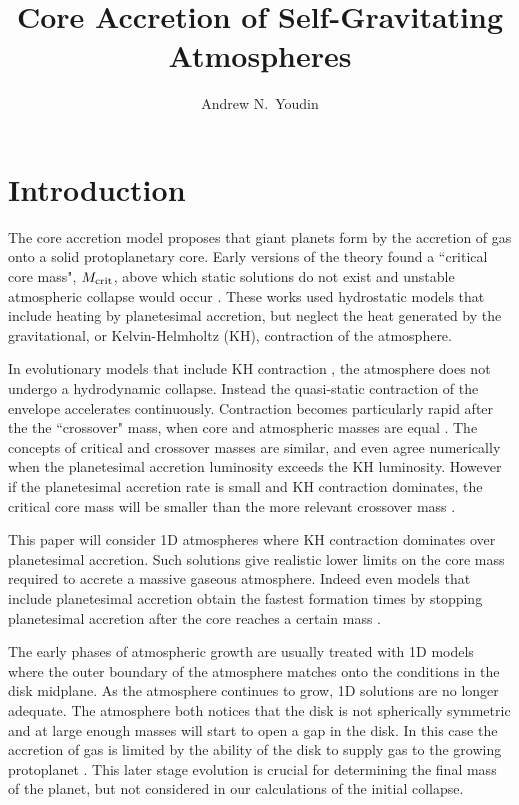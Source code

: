 \documentclass[12pt, preprint,numberedappendix]{emulateapj}
\newcommand{\MC}{M_{\rm crit}}
\begin{document}



\title{Core Accretion of Self-Gravitating Atmospheres}
\author{Andrew N.\ Youdin}

\section{Introduction}
The core accretion model \citep{PerCam74, MizNak78} proposes that giant planets form by the accretion of gas onto a solid protoplanetary core.    Early versions of the theory found a ``critical core mass", $\MC$, above which static solutions do not exist and unstable atmospheric collapse would occur \citep{Har78, Miz80}.  These works used hydrostatic models that include heating by planetesimal accretion, but neglect the heat generated by the gravitational, or Kelvin-Helmholtz (KH), contraction of the atmosphere.  

In evolutionary models that include KH contraction \citep{BodPol86}, the atmosphere does not undergo a hydrodynamic collapse.  Instead the quasi-static contraction of the envelope accelerates continuously.  Contraction becomes particularly rapid after the the  ``crossover" mass, when core and atmospheric masses are equal \citep{pollack96}.  The concepts of critical and crossover masses are similar, and even agree numerically when the planetesimal accretion luminosity exceeds the KH luminosity.  However if the planetesimal accretion rate is small and KH contraction dominates, the critical core mass will be smaller than the more relevant  crossover mass \citep{IkoNak00}.

This paper will consider 1D atmospheres  where KH contraction dominates over planetesimal accretion.  Such solutions give realistic lower limits on the core mass required to accrete a massive gaseous atmosphere.  Indeed even models that include planetesimal accretion obtain the fastest formation times by stopping planetesimal accretion after the core reaches a certain mass \citep{HubBod05}.

The early phases of atmospheric growth are usually treated with 1D models where the outer boundary of the atmosphere matches onto the conditions in the disk midplane.   As the atmosphere continues to grow, 1D solutions are no longer adequate.  The atmosphere both notices that the disk is not spherically symmetric and at large enough masses will start to open a gap in the disk.  In this case the accretion of gas is limited by the ability of the disk to supply gas to the growing protoplanet \citep{DAnLub08}.  This later stage evolution is crucial for determining the final mass of the planet, but  not considered in our calculations of the initial collapse.
 
\end{document}
